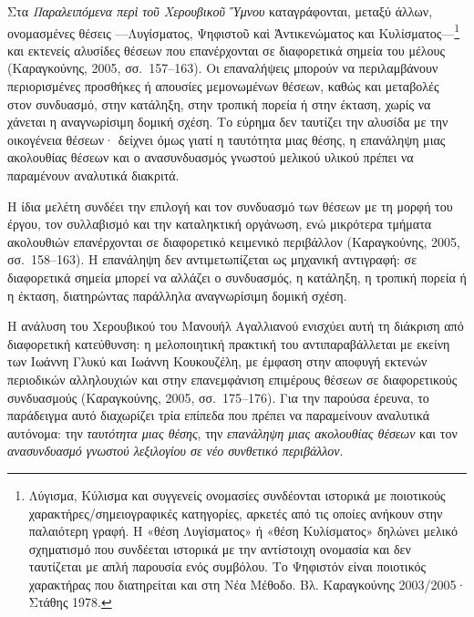 \documentclass[11pt,a4paper]{article}
\begin{document}
Στα \emph{Παραλειπόμενα περὶ τοῦ Χερουβικοῦ Ὕμνου} καταγράφονται, μεταξύ άλλων, ονομασμένες θέσεις ---Λυγίσματος, Ψηφιστοῦ καὶ Ἀντικενώματος και Κυλίσματος---\footnote{Λύγισμα, Κύλισμα και συγγενείς ονομασίες συνδέονται ιστορικά με ποιοτικούς χαρακτήρες/σημειογραφικές κατηγορίες, αρκετές από τις οποίες ανήκουν στην παλαιότερη γραφή. Η «θέση Λυγίσματος» ή «θέση Κυλίσματος» δηλώνει μελικό σχηματισμό που συνδέεται ιστορικά με την αντίστοιχη ονομασία και δεν ταυτίζεται με απλή παρουσία ενός συμβόλου. Το Ψηφιστόν είναι ποιοτικός χαρακτήρας που διατηρείται και στη Νέα Μέθοδο. Βλ. Καραγκούνης 2003/2005· Στάθης 1978.} και εκτενείς αλυσίδες θέσεων που επανέρχονται σε διαφορετικά σημεία του μέλους (Καραγκούνης, 2005, σσ.~157--163). Οι επαναλήψεις μπορούν να περιλαμβάνουν περιορισμένες προσθήκες ή απουσίες μεμονωμένων θέσεων, καθώς και μεταβολές στον συνδυασμό, στην κατάληξη, στην τροπική πορεία ή στην έκταση, χωρίς να χάνεται η αναγνωρίσιμη δομική σχέση. Το εύρημα δεν ταυτίζει την αλυσίδα με την οικογένεια θέσεων· δείχνει όμως γιατί η ταυτότητα μιας θέσης, η επανάληψη μιας ακολουθίας θέσεων και ο ανασυνδυασμός γνωστού μελικού υλικού πρέπει να παραμένουν αναλυτικά διακριτά.

Η ίδια μελέτη συνδέει την επιλογή και τον συνδυασμό των θέσεων με τη μορφή του έργου, τον συλλαβισμό και την καταληκτική οργάνωση, ενώ μικρότερα τμήματα ακολουθιών επανέρχονται σε διαφορετικό κειμενικό περιβάλλον (Καραγκούνης, 2005, σσ.~158--163). Η επανάληψη δεν αντιμετωπίζεται ως μηχανική αντιγραφή: σε διαφορετικά σημεία μπορεί να αλλάζει ο συνδυασμός, η κατάληξη, η τροπική πορεία ή η έκταση, διατηρώντας παράλληλα αναγνωρίσιμη δομική σχέση.

Η ανάλυση του Χερουβικού του Μανουήλ Αγαλλιανού ενισχύει αυτή τη διάκριση από διαφορετική κατεύθυνση: η μελοποιητική πρακτική του αντιπαραβάλλεται με εκείνη των Ιωάννη Γλυκύ και Ιωάννη Κουκουζέλη, με έμφαση στην αποφυγή εκτενών περιοδικών αλληλουχιών και στην επανεμφάνιση επιμέρους θέσεων σε διαφορετικούς συνδυασμούς (Καραγκούνης, 2005, σσ.~175--176). Για την παρούσα έρευνα, το παράδειγμα αυτό διαχωρίζει τρία επίπεδα που πρέπει να παραμείνουν αναλυτικά αυτόνομα: την \emph{ταυτότητα μιας θέσης}, την \emph{επανάληψη μιας ακολουθίας θέσεων} και τον \emph{ανασυνδυασμό γνωστού λεξιλογίου σε νέο συνθετικό περιβάλλον}.
\end{document}
